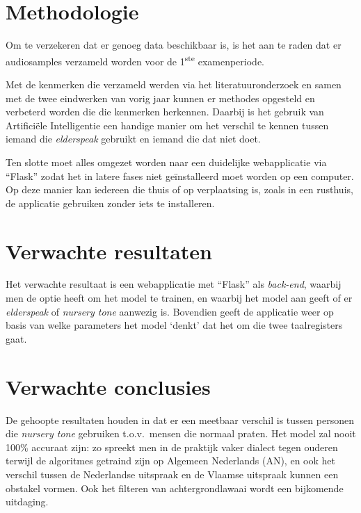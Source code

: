 \section{Methodologie}
\label{sec:methodologie}

Om te verzekeren dat er genoeg data beschikbaar is, is het aan te raden dat er audiosamples verzameld worden voor de 1\textsuperscript{ste} examenperiode.

Met de kenmerken die verzameld werden via het literatuuronderzoek en samen met de twee eindwerken van vorig jaar kunnen er methodes opgesteld en verbeterd worden die die kenmerken herkennen. %
Daarbij is het gebruik van Artificiële Intelligentie een handige manier om het verschil te kennen tussen iemand die \textit{elderspeak} gebruikt en iemand die dat niet doet.

Ten slotte moet alles omgezet worden naar een duidelijke webapplicatie via ``Flask'' zodat het in latere fases niet geïnstalleerd moet worden op een computer. Op deze manier kan iedereen die thuis of op verplaatsing is, zoals in een rusthuis, de applicatie gebruiken zonder iets te installeren. %


\section{Verwachte resultaten}
\label{sec:verwachte_resultaten}

Het verwachte resultaat is een webapplicatie met ``Flask'' als \textit{back-end}, waarbij men de optie heeft om het model te trainen, en waarbij het model aan geeft of er \textit{elderspeak} of \textit{nursery tone} aanwezig is. Bovendien geeft de applicatie weer op basis van welke parameters het model `denkt' dat het om die twee taalregisters gaat.

\section{Verwachte conclusies}
\label{sec:verwachte_conclusies}

De gehoopte resultaten houden in dat er een meetbaar verschil is tussen personen die \textit{nursery tone} gebruiken t.o.v.\ mensen die normaal praten.
Het model zal nooit 100\% accuraat zijn: zo spreekt men in de praktijk vaker dialect tegen ouderen terwijl de algoritmes getraind zijn op Algemeen Nederlands (AN), en ook het verschil tussen de Nederlandse uitspraak en de Vlaamse uitspraak kunnen een obstakel vormen.
Ook het filteren van achtergrondlawaai wordt een bijkomende uitdaging.

